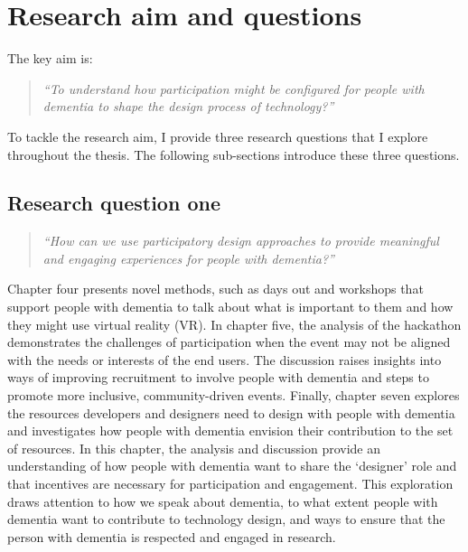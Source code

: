 \section{Research aim and questions}
\label{Intro:RQ}
The key aim is:
\begin{quote}
    \textit{``To understand how participation might be configured for people with dementia to shape the design process of technology?''}
\end{quote}
To tackle the research aim, I provide three research questions that I explore throughout the thesis. The following sub-sections introduce these three questions.

\subsection{Research question one}
\label{RQ1}
\begin{quote}
\textit{``How can we use participatory design approaches to provide meaningful and engaging experiences for people with dementia?''}
\end{quote}
Chapter four presents novel methods, such as days out and workshops that support people with dementia to talk about what is important to them and how they might use virtual reality (VR). In chapter five, the analysis of the hackathon demonstrates the challenges of participation when the event may not be aligned with the needs or interests of the end users. The discussion raises insights into ways of improving recruitment to involve people with dementia and steps to promote more inclusive, community-driven events. Finally, chapter seven explores the resources developers and designers need to design with people with dementia and investigates how people with dementia envision their contribution to the set of resources. In this chapter, the analysis and discussion provide an understanding of how people with dementia want to share the `designer' role and that incentives are necessary for participation and engagement. This exploration draws attention to how we speak about dementia, to what extent people with dementia want to contribute to technology design, and ways to ensure that the person with dementia is respected and engaged in research.

